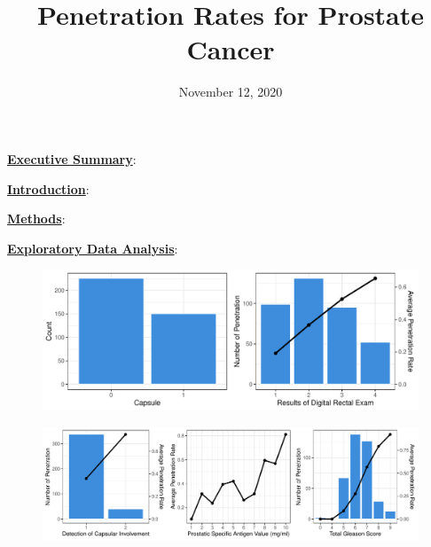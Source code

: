 \documentclass[11pt]{article}\usepackage[]{graphicx}\usepackage[]{color}
\title{Penetration Rates for Prostate Cancer\vspace{-5ex}}
\date{November 12, 2020\vspace{-5ex}}
\makeatletter
\def\maxwidth{ %
  \ifdim\Gin@nat@width>\linewidth
    \linewidth
  \else
    \Gin@nat@width
  \fi
}
\makeatother
\begin{document}
 
\maketitle
\hfill \break










\noindent\textbf{\underline{Executive Summary}}: 
\hfill \break

\noindent\textbf{\underline{Introduction}}: 
\hfill \break

\noindent\textbf{\underline{Methods}}:    
\hfill \break

\noindent\textbf{\underline{Exploratory Data Analysis}}: 
\hfill \break

\begin{figure}[h!] 
\begin{center}

\includegraphics[width=\maxwidth]{figure/unnamed-chunk-1-1} 

\caption{}
\label{explore1}
\end{center} 
\end{figure}


\begin{figure}[h!] 
\begin{center}

\includegraphics[width=\maxwidth]{figure/unnamed-chunk-2-1} 

\caption{}
\label{explore2}
\end{center} 
\end{figure}
\end{document}
